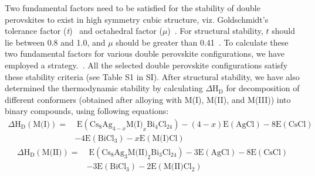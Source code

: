 \documentclass[journal=jpclcd,manuscript=letter]{achemso}
\begin{document}
Two fundamental factors need to be satisfied for the stability of double perovskites to exist in high symmetry cubic structure, viz.  Goldschmidt's tolerance factor (\textit{t})~\cite{kieslich2015extended} and octahedral factor (\textit{$\mu$})~\cite{li2008formability}.
For structural stability, $t$ should lie between 0.8 and 1.0, and $\mu$ should be greater than 0.41~\cite{kangsabanik2018double}.
To calculate these two fundamental factors for various double perovskite configurations, we have employed a strategy.~\cite{S14}.
All the selected double perovskite configurations satisfy these stability criteria (see Table S1 in SI). After structural stability, we have also determined the thermodynamic stability by calculating $\Delta$H$_{\textrm{D}}$ for decomposition of different conformers (obtained after alloying with M(I), M(II), and M(III)) into binary compounds, using following equations:
\begin{equation}
	\begin{split}
	\Delta \textrm{H}_{\textrm{D}}(\textrm{M(I)})  = &\; \textrm{E}\left(\textrm{Cs}_8\textrm{Ag}_{4-x}\textrm{M(I)}_x\textrm{Bi}_4\textrm{Cl}_{24}\right) -  \left(4-x\right)\textrm{E}\left(\textrm{Ag}\textrm{Cl}\right) - 8\textrm{E}\left(\textrm{Cs}\textrm{Cl}\right)\\& - 4\textrm{E}\left(\textrm{Bi}\textrm{Cl}_3\right) - x\textrm{E}\left(\textrm{M(I)}\textrm{Cl}\right)
	\label{eq:1}
	\end{split}
\end{equation} 
\begin{equation}
	\begin{split}    
	\Delta \textrm{H}_{\textrm{D}}(\textrm{M(II)}) = &\; \textrm{E}\left(\textrm{Cs}_8\textrm{Ag}_{3}\textrm{M(II)}_{2}\textrm{Bi}_{3}\textrm{Cl}_{24}\right) -  3\textrm{E}\left(\textrm{Ag}\textrm{Cl}\right) - 8\textrm{E}\left(\textrm{Cs}\textrm{Cl}\right)\\ & - 3\textrm{E}\left(\textrm{Bi}\textrm{Cl}_3\right) - 2\textrm{E}\left(\textrm{M(II)}\textrm{Cl}_2\right) 
	\end{split}
\end{equation}
\end{document}
